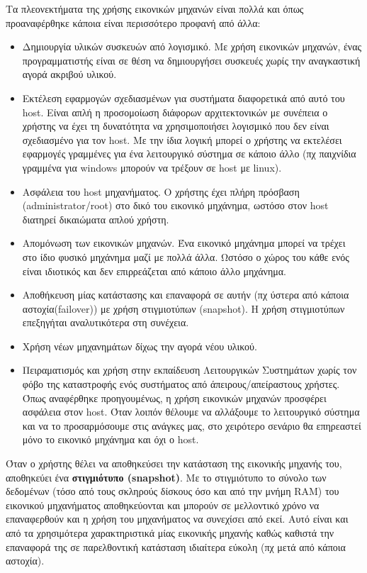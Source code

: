 Τα πλεονεκτήματα της χρήσης εικονικών μηχανών είναι πολλά και όπως προαναφέρθηκε
κάποια είναι περισσότερο προφανή από άλλα:
\begin{itemize}
	\item Δημιουργία υλικών συσκευών από λογισμικό. Με χρήση εικονικών μηχανών,
		ένας προγραμματιστής είναι σε θέση να δημιουργήσει συσκευές χωρίς την
		αναγκαστική αγορά ακριβού υλικού.
	\item Εκτέλεση εφαρμογών σχεδιασμένων για συστήματα διαφορετικά από αυτό
		του host. Είναι απλή η προσομοίωση διάφορων αρχιτεκτονικών με συνέπεια ο
		χρήστης να έχει τη δυνατότητα να χρησιμοποιήσει λογισμικό που δεν είναι
		σχεδιασμένο για τον host. Με την ίδια λογική μπορεί ο χρήστης να
		εκτελέσει εφαρμογές γραμμένες για ένα λειτουργικό σύστημα σε κάποιο άλλο
		(πχ παιχνίδια γραμμένα για windows μπορούν  να τρέξουν σε host με
		linux).
	\item Ασφάλεια του host μηχανήματος. Ο χρήστης έχει πλήρη πρόσβαση
		(administrator/root) στο δικό του εικονικό μηχάνημα, ωστόσο στον host
		διατηρεί δικαιώματα απλού χρήστη.
	\item Απομόνωση των εικονικών μηχανών. Ένα εικονικό μηχάνημα μπορεί να
		τρέχει στο ίδιο φυσικό μηχάνημα μαζί με πολλά άλλα. Ωστόσο ο χώρος του
		κάθε ενός είναι ιδιοτικός και δεν επιρρεάζεται από κάποιο άλλο μηχάνημα.
	\item Αποθήκευση μίας κατάστασης και επαναφορά σε αυτήν (πχ ύστερα από
		κάποια αστοχία(failover)) με χρήση στιγμιοτύπων (snapshot). Η χρήση
		στιγμιοτύπων επεξηγήται αναλυτικότερα στη συνέχεια.
	\item Χρήση νέων μηχανημάτων δίχως την αγορά νέου υλικού.
	\item Πειραματισμός και χρήση στην εκπαίδευση Λειτουργικών Συστημάτων
		χωρίς τον φόβο της καταστροφής ενός συστήματος από
		άπειρους/απείραστους χρήστες. Όπως αναφέρθηκε προηγουμένως, η χρήση
		εικονικών μηχανών προσφέρει ασφάλεια στον host. Όταν λοιπόν θέλουμε να
		αλλάξουμε το λειτουργικό σύστημα και να το προσαρμόσουμε στις ανάγκες
		μας, στο χειρότερο σενάριο θα επηρεαστεί μόνο το εικονικό μηχάνημα και
		όχι ο host.
\end{itemize}

Όταν ο χρήστης θέλει να αποθηκεύσει την κατάσταση της εικονικής μηχανής του,
αποθηκεύει ένα \textbf{στιγμιότυπο (snapshot)}. Με το στιγμιότυπο το σύνολο των
δεδομένων (τόσο από τους σκληρούς δίσκους όσο και από την μνήμη RAM) του
εικονικού μηχανήματος αποθηκεύονται και μπορούν σε μελλοντικό χρόνο να
επαναφερθούν και η χρήση του μηχανήματος να συνεχίσει από εκεί. Αυτό είναι
και από τα χρησιμότερα χαρακτηριστικά μίας εικονικής μηχανής καθώς καθιστά την
επαναφορά της σε παρελθοντική κατάσταση ιδιαίτερα εύκολη (πχ μετά από κάποια
αστοχία).
